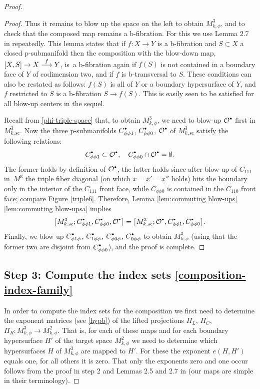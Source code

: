 \documentclass[11pt]{article}
\numberwithin{equation}{section}
\newcommand\To[1]{\mathchoice{\xrightarrow{\textstyle\kern4pt#1\kern3pt}}{\stackrel{#1}{\longrightarrow}}{}{}}
\newcommand{\bbullet}{{\scriptscriptstyle\bullet}}
\newcommand{\sbullet}{{\raisebox{1pt}{$\bbullet$}}}
\theoremstyle{plain}
\theoremstyle{definition}
\newcommand\calO{{\mathcal O}}
\newcommand{\ssc}{{\mathrm{sc}}}
\begin{document}
\begin{proof}
\begin{proof}
Thus it remains to blow up the space on the left to obtain $M^3_{k,\phi}$, and to check that the composed map remains a b-fibration.
For this we use Lemma 2.7 in \cite{analytic-surgery} repeatedly. This lemma states that if $f:X\to Y$ is a b-fibration and $S\subset X$ a closed p-submanifold then the composition with the blow-down map, $[X,S]\to X\To{f} Y$, is~a b-fibration again if $f(S)$ is not contained in a boundary face of $Y$ of codimension two, and if $f$ is b-transversal to $S$. These conditions can also be restated as follows: $f(S)$ is all of $Y$ or a boundary hypersurface of $Y$, and $f$ restricted to $S$ is a b-fibration $S\to f(S)$. This is easily seen to be satisfied for all blow-up centers in the sequel.

Recall from \eqref{phi-triple-space} that, to obtain $M^3_{k,\phi}$, we need to blow-up $\calO^\sbullet$ first in $M^3_{k,\ssc}$. Now the three p-submanifolds $C_{\phi\phi1}^\sbullet$, $C_{\phi\phi0}^\sbullet$, $\calO^\sbullet$ of $M^3_{k,\ssc}$ satisfy the following relations:
\[
C_{\phi\phi1}^\sbullet \subset \calO^\sbullet,\quad C_{\phi\phi0}^\sbullet \cap \calO^\sbullet = \emptyset.
\]
The former holds by definition of $\calO^\sbullet$, the latter holds since after
blow-up of $C_{111}$ in~$M^3$ the triple fiber diagonal (on which $x=x'=x''$ holds) hits the boundary only in the interior of the $C_{111}$ front face, while $C_{\phi\phi0}$ is contained in the $C_{110}$ front face;
compare Figure
\ref{triple6}.
Therefore,
Lemma \ref{lem:commuting blow-ups}\eqref{lem:commuting blow-upsa} implies
\[
\bigl[M^{3}_{k,\ssc}; C_{\phi\phi1}^\sbullet,
C_{\phi\phi0}^\sbullet,\calO^\sbullet\bigr] = \bigl[M^{3}_{k,\ssc}; \calO^\sbullet, C_{\phi\phi1}^\sbullet,
C_{\phi\phi0}^\sbullet\bigr].
\]
Finally, we blow up $C_{\phi1\phi}^\sbullet$, $C_{1\phi\phi}^\sbullet$, $C_{\phi0\phi}^\sbullet$, $C_{0\phi\phi}^\sbullet$ to obtain $M^3_{k,\phi}$ (using that the former two are disjoint from $C_{\phi\phi0}^\sbullet$), and the proof is complete.
\end{proof}

\subsection*{Step 3: Compute the index sets \eqref{composition-index-family}}
In order to compute the index sets for the composition we first need to determine the exponent matrices (see \eqref{hypb}) of the lifted projections $\Pi_L$, $\Pi_C$, $\Pi_R: M^3_{k,\phi}\to M^2_{k,\phi}$. That is, for each of these maps and for each boundary hypersurface $H'$ of the target space $M^2_{k,\phi}$ we need to determine which hypersurfaces $H$ of $M^3_{k,\phi}$ are mapped to $H'$. For these the exponent $e(H,H')$ equals one, for all others it is zero. That only the exponents zero and one occur follows from the proof in step 2 and Lemmas 2.5 and 2.7 in \cite{analytic-surgery} (our maps are simple in their terminology).


\end{proof}
\end{document}
